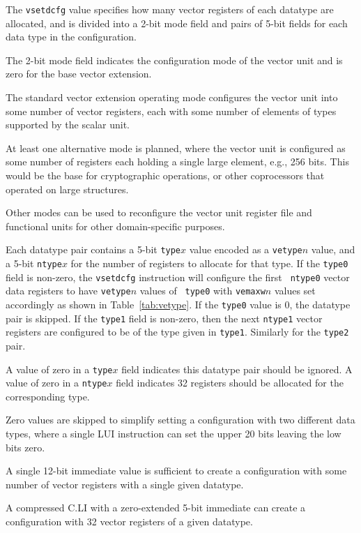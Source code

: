 The {\tt vsetdcfg} value specifies how many vector registers of each
datatype are allocated, and is divided into a 2-bit mode field and
pairs of 5-bit fields for each data type in the configuration.

The 2-bit mode field indicates the configuration mode of the vector
unit and is zero for the base vector extension.

\begin{commentary}
  The standard vector extension operating mode configures the vector
  unit into some number of vector registers, each with some number of
  elements of types supported by the scalar unit.

  At least one alternative mode is planned, where the vector unit is
  configured as some number of registers each holding a single large
  element, e.g., 256 bits.  This would be the base for cryptographic
  operations, or other coprocessors that operated on large structures.

  Other modes can be used to reconfigure the vector unit register file
  and functional units for other domain-specific purposes.
\end{commentary}

Each datatype pair contains a 5-bit {\tt type}$x$ value encoded as a
{\tt vetype}$n$ value, and a 5-bit {\tt ntype}$x$ for the number of
registers to allocate for that type. If the {\tt type0} field is
non-zero, the {\tt vsetdcfg} instruction will configure the first {\tt
  ntype0} vector data registers to have {\tt vetype}$n$ values of {\tt
  type0} with {\tt vemaxw}$n$ values set accordingly as shown in
Table~\ref{tab:vetype}.  If the {\tt type0} value is 0, the datatype
pair is skipped.  If the {\tt type1} field is non-zero, then the next
{\tt ntype1} vector registers are configured to be of the type given
in {\tt type1}.  Similarly for the {\tt type2} pair.

A value of zero in a {\tt type}$x$ field indicates this datatype pair
should be ignored.  A value of zero in a {\tt ntype}$x$ field
indicates 32 registers should be allocated for the corresponding type.

\begin{commentary}
Zero values are skipped to simplify setting a configuration with two
different data types, where a single LUI instruction can set the upper
20 bits leaving the low bits zero.

A single 12-bit immediate value is sufficient to create a
configuration with some number of vector registers with a single given
datatype.

A compressed C.LI with a zero-extended 5-bit immediate can create a
configuration with 32 vector registers of a given datatype.
\end{commentary}

